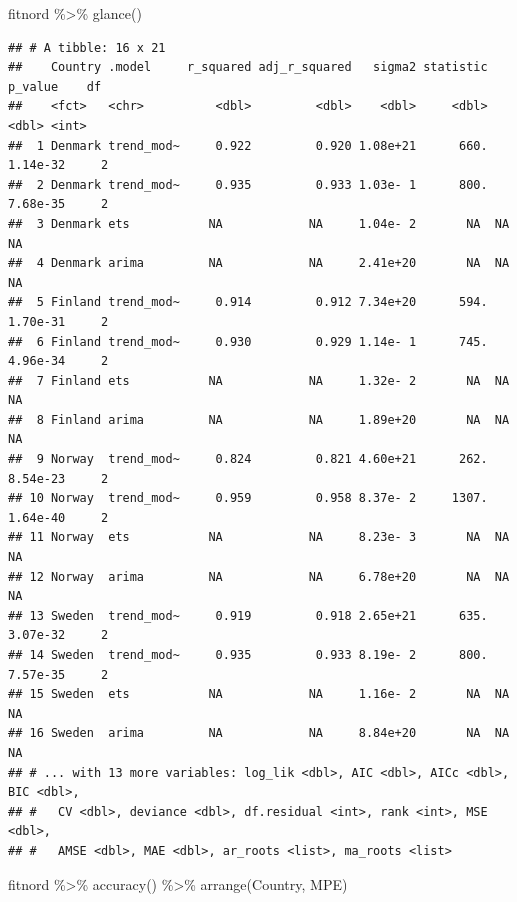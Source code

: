 \documentclass[
]{book}
\newenvironment{Shaded}{\begin{snugshade}}{\end{snugshade}}
\newcommand{\FunctionTok}[1]{\textcolor[rgb]{0.00,0.00,0.00}{#1}}
\newcommand{\NormalTok}[1]{#1}
\newcommand{\SpecialCharTok}[1]{\textcolor[rgb]{0.00,0.00,0.00}{#1}}
\begin{document}
\begin{Shaded}
\begin{Highlighting}[]
\NormalTok{fitnord }\SpecialCharTok{\%\textgreater{}\%}  \FunctionTok{glance}\NormalTok{()  }
\end{Highlighting}
\end{Shaded}

\begin{verbatim}
## # A tibble: 16 x 21
##    Country .model     r_squared adj_r_squared   sigma2 statistic   p_value    df
##    <fct>   <chr>          <dbl>         <dbl>    <dbl>     <dbl>     <dbl> <int>
##  1 Denmark trend_mod~     0.922         0.920 1.08e+21      660.  1.14e-32     2
##  2 Denmark trend_mod~     0.935         0.933 1.03e- 1      800.  7.68e-35     2
##  3 Denmark ets           NA            NA     1.04e- 2       NA  NA           NA
##  4 Denmark arima         NA            NA     2.41e+20       NA  NA           NA
##  5 Finland trend_mod~     0.914         0.912 7.34e+20      594.  1.70e-31     2
##  6 Finland trend_mod~     0.930         0.929 1.14e- 1      745.  4.96e-34     2
##  7 Finland ets           NA            NA     1.32e- 2       NA  NA           NA
##  8 Finland arima         NA            NA     1.89e+20       NA  NA           NA
##  9 Norway  trend_mod~     0.824         0.821 4.60e+21      262.  8.54e-23     2
## 10 Norway  trend_mod~     0.959         0.958 8.37e- 2     1307.  1.64e-40     2
## 11 Norway  ets           NA            NA     8.23e- 3       NA  NA           NA
## 12 Norway  arima         NA            NA     6.78e+20       NA  NA           NA
## 13 Sweden  trend_mod~     0.919         0.918 2.65e+21      635.  3.07e-32     2
## 14 Sweden  trend_mod~     0.935         0.933 8.19e- 2      800.  7.57e-35     2
## 15 Sweden  ets           NA            NA     1.16e- 2       NA  NA           NA
## 16 Sweden  arima         NA            NA     8.84e+20       NA  NA           NA
## # ... with 13 more variables: log_lik <dbl>, AIC <dbl>, AICc <dbl>, BIC <dbl>,
## #   CV <dbl>, deviance <dbl>, df.residual <int>, rank <int>, MSE <dbl>,
## #   AMSE <dbl>, MAE <dbl>, ar_roots <list>, ma_roots <list>
\end{verbatim}

\begin{Shaded}
\begin{Highlighting}[]
\NormalTok{fitnord }\SpecialCharTok{\%\textgreater{}\%}
  \FunctionTok{accuracy}\NormalTok{() }\SpecialCharTok{\%\textgreater{}\%}
  \FunctionTok{arrange}\NormalTok{(Country, MPE)}
\end{Highlighting}
\end{Shaded}
\end{document}

